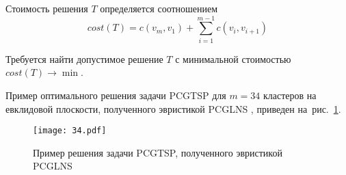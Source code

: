 Стоимость решения $T$ определяется соотношением
$$
	cost(T) = c(v_m,v_1) + \sum_{i=1}^{m-1} c(v_i,v_{i+1})
$$

Требуется найти допустимое решение
$ T $
с минимальной стоимостью $ cost (T) \to \min$.

Пример оптимального решения задачи
PCGTSP
для $m=34$ кластеров
на евклидовой плоскости,
полученного эвристикой
PCGLNS
\cite{KKP-optima2020},
приведен на~рис.~\ref{fig:pcgtsp.svg}.

\begin{figure}
  \centering
  \texttt{[image: 34.pdf]}
  \caption{Пример решения задачи PCGTSP, полученного эвристикой PCGLNS}
  \label{fig:pcgtsp.svg}
\end{figure}
